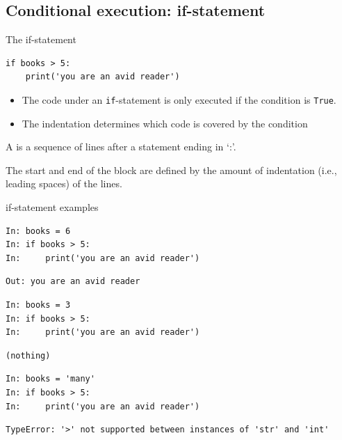 \documentclass[aspectratio=169,usenames,dvipsnames]{beamer}
\begin{document}
\subsection{Conditional execution: if-statement}
\frame{\tableofcontents[currentsubsection]}

\begin{frame}[fragile]{The if-statement}
\begin{lstlisting}
if books > 5:
    print('you are an avid reader')
\end{lstlisting}

    \begin{itemize}
        \item The code under an \lstinline{if}-statement is only executed
            if the condition is \lstinline{True}.
        \item The indentation determines which code is covered
            by the condition
    \end{itemize}

    \pause
    \begin{definition}
        A  is a sequence of lines after
        a statement ending in `:'.

        The start and end of the block are defined by the amount of indentation
        (i.e., leading spaces) of the lines.
    \end{definition}
\end{frame}

\begin{frame}[fragile]{if-statement examples}
\begin{lstlisting}
In: books = 6
In: if books > 5:
In:     print('you are an avid reader')
\end{lstlisting}\vspace{-1em}\pause\begin{lstlisting}
Out: you are an avid reader
\end{lstlisting}
\pause
\begin{lstlisting}
In: books = 3
In: if books > 5:
In:     print('you are an avid reader')
\end{lstlisting}\vspace{-1em}\pause\begin{lstlisting}
(nothing)
\end{lstlisting}
\pause
\begin{lstlisting}
In: books = 'many'
In: if books > 5:
In:     print('you are an avid reader')
\end{lstlisting}\vspace{-1em}\pause\begin{lstlisting}
TypeError: '>' not supported between instances of 'str' and 'int'
\end{lstlisting}
\end{frame}
\end{document}
